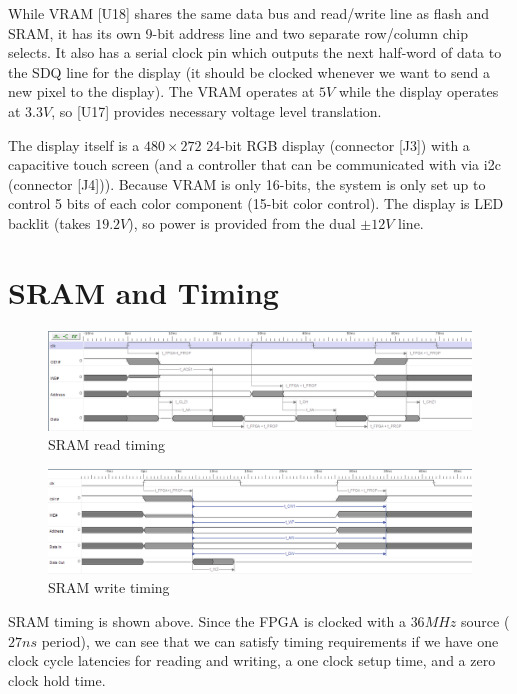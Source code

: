 While VRAM [U18] shares the same data bus and read/write line as flash and SRAM, it has its own 9-bit address line and two separate row/column chip selects. It also has a serial clock pin which outputs the next half-word of data to the SDQ line for the display (it should be clocked whenever we want to send a new pixel to the display). The VRAM operates at $5V$ while the display operates at $3.3V$, so [U17] provides necessary voltage level translation.

The display itself is a $480 \times 272$ 24-bit RGB display (connector [J3]) with a capacitive touch screen (and a controller that can be communicated with via i2c (connector [J4])). Because VRAM is only 16-bits, the system is only set up to control 5 bits of each color component (15-bit color control). The display is LED backlit (takes $19.2V$), so power is provided from the dual $\pm 12V$ line.

\section{SRAM and Timing}

\begin{figure}[ht!]
    \centering
    \includegraphics[width=6in]{Timing/FPGA-Oscilloscope-RAM-READ.png}
		\caption{SRAM read timing}
\end{figure}

\begin{figure}[ht!]
    \centering
    \includegraphics[width=6in]{Timing/FPGA-Oscilloscope-RAM-WRITE.png}
		\caption{SRAM write timing}
\end{figure}

SRAM timing is shown above. Since the FPGA is clocked with a $36MHz$ source ($27ns$ period), we can see that we can satisfy timing requirements if we have one clock cycle latencies for reading and writing, a one clock setup time, and a zero clock hold time.

